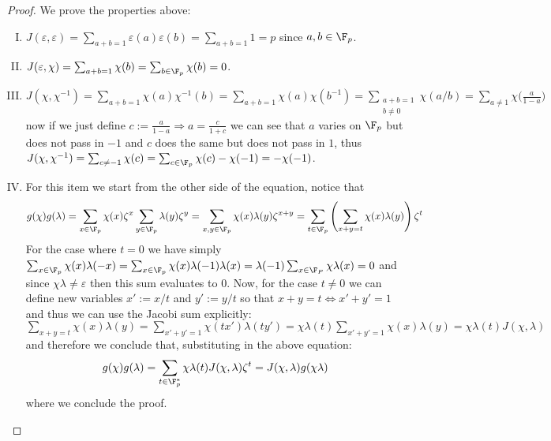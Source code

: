 \begin{proof}
    We prove the properties above:
    \begin{enumerate}[I.]
        \item \(J(\varepsilon, \varepsilon) = \sum_{a + b = 1} \varepsilon(a)
              \varepsilon(b) = \sum_{a+b=1} 1 = p\) since \(a, b \in \F_p\).
        \item \(J(\varepsilon, \chi) = \sum_{a+b = 1} \chi(b) = \sum_{b \in \F_p}
              \chi(b) = 0\).
        \item \(J(\chi, \chi^{-1}) = \sum_{a+b=1} \chi(a) \chi^{-1}(b) = \sum_{a +
                  b = 1} \chi(a)\chi(b^{-1}) = \sum_{\substack{a+b=1\\ b \neq 0}}
              \chi(a/b) = \sum_{a \neq 1} \chi\big(\frac{a}{1-a}\big)\) now if we
              just define \(c := \frac{a}{1-a} \Rightarrow a = \frac{c}{1 + c}\) we
              can see that \(a\) varies on \(\F_p\) but does not pass in \(-1\) and
              \(c\) does the same but does not pass in \(1\), thus \(J(\chi,
              \chi^{-1}) = \sum_{c \neq -1} \chi(c) = \sum_{c \in \F_p} \chi(c) -
              \chi(-1) = - \chi(-1)\).
        \item For this item we start from the other side of the equation, notice
              that
              \begin{align*}
                  g(\chi)g(\lambda)
                  = \sum_{x \in \F_p} \chi(x)\zeta^{x}\sum_{y \in \F_p}
                  \lambda(y)\zeta^{y}
                  = \sum_{x, y \in \F_p} \chi(x)\lambda(y)\zeta^{x+y}
                  = \sum_{t \in \F_p} \left( \sum_{x+y=t} \chi(x)\lambda(y) \right)
                  \zeta^t
              \end{align*}
              For the case where \(t=0\) we have simply \(\sum_{x \in \F_p}
              \chi(x)\lambda(-x) = \sum_{x \in \F_p} \chi(x) \lambda(-1)\lambda(x) =
              \lambda(-1)\sum_{x \in \F_P} \chi\lambda(x) = 0\) and since
              \(\chi\lambda \neq  \varepsilon\) then this sum evaluates to \(0\).
              Now, for the case \(t \neq  0\) we can define new variables \(x' :=
              x/t\) and  \(y' := y/t\) so that  \(x + y = t \Leftrightarrow x' + y' =
              1\) and thus we can use the Jacobi sum explicitly:
              \(\sum_{x+y=t}\chi(x)\lambda(y) = \sum_{x'+y'=1} \chi(tx')\lambda(ty')
              = \chi\lambda(t) \sum_{x' + y' = 1} \chi(x)\lambda(y) = \chi\lambda(t)
              J(\chi, \lambda)\) and therefore we conclude that, substituting in the
              above equation:
              \[
                  g(\chi)g(\lambda)
                  = \sum_{t \in \F_p^\ast} \chi\lambda(t) J(\chi, \lambda)\zeta^t
                  = J(\chi, \lambda) g(\chi\lambda)
              \]
              where we conclude the proof.
    \end{enumerate}
\end{proof}

